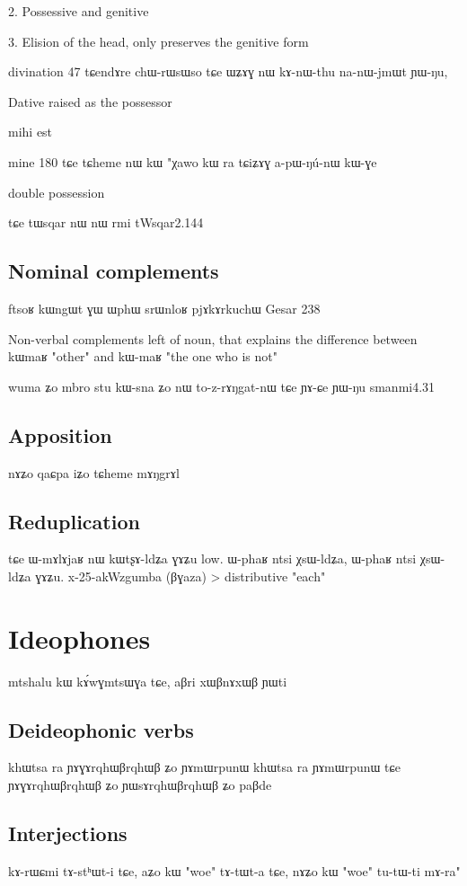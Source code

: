 \documentclass[oldfontcommands,oneside,a4paper,11pt]{memoir}
\newcommand{\wav}[1]{}%
\begin{document}
2. Possessive and genitive

3. Elision of the head, only preserves the genitive form

divination
47	tɕendɤre chɯ-rɯsɯso tɕe ɯʑɤɣ nɯ kɤ-nɯ-thu na-nɯ-jmɯt ɲɯ-ŋu,


Dative raised as the possessor

mihi est

mine
180	tɕe	tɕheme	nɯ	kɯ	"χawo	kɯ	ra	tɕiʑɤɣ	a-pɯ-ŋú-nɯ	kɯ-ɣe


double possession


  tɕe tɯsqar nɯ nɯ rmi
  tWsqar2.144
\section{Nominal complements}  \label{sec:nom.comp}
ftsoʁ kɯngɯt ɣɯ ɯphɯ srɯnloʁ pjɤkɤrkuchɯ
Gesar 238

Non-verbal complements left of noun, that explains the difference between kɯmaʁ "other" and kɯ-maʁ "the one who is not"


wuma ʑo mbro stu kɯ-sna ʑo nɯ to-z-rɤŋgat-nɯ tɕe ɲɤ-ɕe ɲɯ-ŋu
smanmi4.31
\section{Apposition}
nɤʑo qaɕpa
iʑo tɕheme mɤŋgrɤl

\section{Reduplication}


tɕe ɯ-mɤlɤjaʁ nɯ kɯtʂɤ-ldʑa ɣɤʑu low.
ɯ-phaʁ ntsi χsɯ-ldʑa, ɯ-phaʁ ntsi χsɯ-ldʑa ɣɤʑu.
x-25-akWzgumba
(βɣaza)
> distributive "each"
\chapter{Ideophones}


mtshalu kɯ kɤ́wɣmtsɯɣa tɕe, aβri xɯβnɤxɯβ ɲɯti
\section{Deideophonic verbs}
khɯtsa ra ɲɤɣɤrqhɯβrqhɯβ ʑo ɲɤmɯrpunɯ
khɯtsa ra ɲɤmɯrpunɯ tɕe ɲɤɣɤrqhɯβrqhɯβ ʑo
ɲɯsɤrqhɯβrqhɯβ ʑo paβde

\section{Interjections}

kɤ-rɯɕmi tɤ-stʰɯt-i tɕe, aʑo kɯ "woe" tɤ-tɯt-a tɕe, nɤʑo kɯ "woe" tu-tɯ-ti mɤ-ra"
\wav{reponse-oe}
\end{document}
